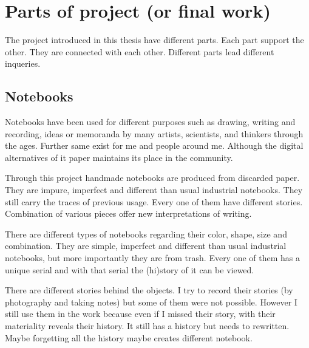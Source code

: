 





%
%
\section{Parts of project (or final work)}
The project introduced in this thesis have different parts. Each part support the other. They are connected with each other. Different parts lead different inqueries.

%
%
\subsection{Notebooks}


Notebooks have been used for different purposes such as drawing, writing and recording, ideas or memoranda by many artists, scientists, and thinkers through the ages. Further same exist for me and people around me. Although the digital alternatives of it paper maintains its place in the community.

Through this project handmade notebooks are produced from discarded paper. They are impure, imperfect and different than usual industrial notebooks. They still carry the traces of previous usage. Every one of them have different stories. Combination of various pieces offer new interpretations of writing.

There are different types of notebooks regarding their color, shape, size and combination. They are simple, imperfect and different than usual industrial notebooks, but more importantly they are from trash. Every one of them has a unique serial and with that serial the (hi)story of it can be viewed.

There are different stories behind the objects. I try to record their stories (by photography and taking notes) but some of them were not possible. However I still use them in the work because even if I missed their story, with their materiality reveals their history. It still has a history but needs to rewritten. Maybe forgetting all the history maybe creates different notebook.

